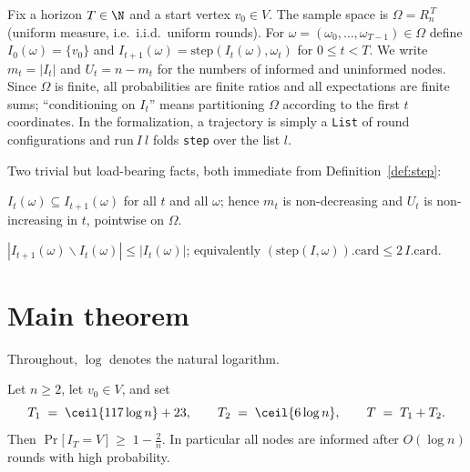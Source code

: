 \begin{definition}[Process]\label{def:process}
  \leanok
  Fix a horizon $T \in \N$ and a start vertex $v_0 \in V$. The sample space
  is $\Omega = R_n^{\,T}$ (uniform measure, i.e.\ i.i.d.\ uniform rounds).
  For $\omega = (\omega_0,\dots,\omega_{T-1}) \in \Omega$ define
  $I_0(\omega) = \{v_0\}$ and
  $I_{t+1}(\omega) = \mathrm{step}(I_t(\omega), \omega_t)$ for $0 \le t < T$.
  We write $m_t = |I_t|$ and $U_t = n - m_t$ for the numbers of informed and
  uninformed nodes. Since $\Omega$ is finite, all probabilities are finite
  ratios and all expectations are finite sums; ``conditioning on $I_t$''
  means partitioning $\Omega$ according to the first $t$ coordinates. In the
  formalization, a trajectory is simply a \texttt{List} of round
  configurations and $\mathrm{run}\ I\ l$ folds \texttt{step} over the list
  $l$.
\end{definition}

Two trivial but load-bearing facts, both immediate from
Definition~\ref{def:step}:

\begin{lemma}[Monotonicity]\label{lem:mono}
  \leanok
  $I_t(\omega) \subseteq I_{t+1}(\omega)$ for all $t$ and all $\omega$;
  hence $m_t$ is non-decreasing and $U_t$ is non-increasing in $t$,
  pointwise on $\Omega$.
\end{lemma}

\begin{lemma}\label{lem:atmost}
  \leanok
  $|I_{t+1}(\omega) \smallsetminus I_t(\omega)| \le |I_t(\omega)|$; equivalently
  $(\mathrm{step}(I,\omega)).\mathrm{card} \le 2\,I.\mathrm{card}$.
\end{lemma}

\section{Main theorem}\label{sec:main-statement}

Throughout, $\log$ denotes the natural logarithm.

\begin{theorem}
  \label{thm:main}
  \leanok
  Let $n \ge 2$, let $v_0 \in V$, and set
  \[
    T_1 \;=\; \ceil{117 \log n} + 23, \qquad
    T_2 \;=\; \ceil{6 \log n}, \qquad
    T \;=\; T_1 + T_2 .
  \]
  Then $\Pr\bigl[\, I_T = V \,\bigr] \;\ge\; 1 - \frac{2}{n}$.
  In particular all nodes are informed after $O(\log n)$ rounds with high
  probability.
\end{theorem}

